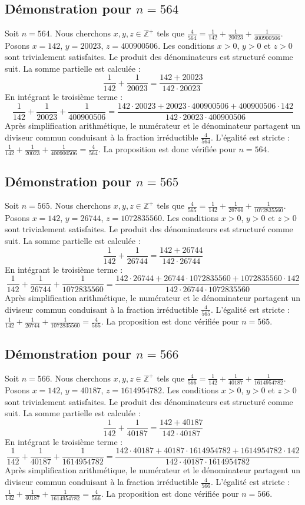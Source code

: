 \documentclass[11pt,a4paper]{article}
\begin{document}
\subsection{Démonstration pour $n = 564$}
Soit $n = 564$. Nous cherchons $x, y, z \in \mathbb{Z}^{+}$ tels que $\frac{4}{564} = \frac{1}{142} + \frac{1}{20023} + \frac{1}{400900506}$.
Posons $x = 142$, $y = 20023$, $z = 400900506$.
Les conditions $x > 0$, $y > 0$ et $z > 0$ sont trivialement satisfaites.
Le produit des dénominateurs est structuré comme suit. La somme partielle est calculée :
$$ \frac{1}{142} + \frac{1}{20023} = \frac{142+20023}{142 \cdot 20023} $$
En intégrant le troisième terme :
$$ \frac{1}{142} + \frac{1}{20023} + \frac{1}{400900506} = \frac{142 \cdot 20023 + 20023 \cdot 400900506 + 400900506 \cdot 142}{142 \cdot 20023 \cdot 400900506} $$
Après simplification arithmétique, le numérateur et le dénominateur partagent un diviseur commun conduisant à la fraction irréductible $\frac{4}{564}$.
L'égalité est stricte : $\frac{1}{142} + \frac{1}{20023} + \frac{1}{400900506} = \frac{4}{564}$.
La proposition est donc vérifiée pour $n = 564$.
\subsection{Démonstration pour $n = 565$}
Soit $n = 565$. Nous cherchons $x, y, z \in \mathbb{Z}^{+}$ tels que $\frac{4}{565} = \frac{1}{142} + \frac{1}{26744} + \frac{1}{1072835560}$.
Posons $x = 142$, $y = 26744$, $z = 1072835560$.
Les conditions $x > 0$, $y > 0$ et $z > 0$ sont trivialement satisfaites.
Le produit des dénominateurs est structuré comme suit. La somme partielle est calculée :
$$ \frac{1}{142} + \frac{1}{26744} = \frac{142+26744}{142 \cdot 26744} $$
En intégrant le troisième terme :
$$ \frac{1}{142} + \frac{1}{26744} + \frac{1}{1072835560} = \frac{142 \cdot 26744 + 26744 \cdot 1072835560 + 1072835560 \cdot 142}{142 \cdot 26744 \cdot 1072835560} $$
Après simplification arithmétique, le numérateur et le dénominateur partagent un diviseur commun conduisant à la fraction irréductible $\frac{4}{565}$.
L'égalité est stricte : $\frac{1}{142} + \frac{1}{26744} + \frac{1}{1072835560} = \frac{4}{565}$.
La proposition est donc vérifiée pour $n = 565$.
\subsection{Démonstration pour $n = 566$}
Soit $n = 566$. Nous cherchons $x, y, z \in \mathbb{Z}^{+}$ tels que $\frac{4}{566} = \frac{1}{142} + \frac{1}{40187} + \frac{1}{1614954782}$.
Posons $x = 142$, $y = 40187$, $z = 1614954782$.
Les conditions $x > 0$, $y > 0$ et $z > 0$ sont trivialement satisfaites.
Le produit des dénominateurs est structuré comme suit. La somme partielle est calculée :
$$ \frac{1}{142} + \frac{1}{40187} = \frac{142+40187}{142 \cdot 40187} $$
En intégrant le troisième terme :
$$ \frac{1}{142} + \frac{1}{40187} + \frac{1}{1614954782} = \frac{142 \cdot 40187 + 40187 \cdot 1614954782 + 1614954782 \cdot 142}{142 \cdot 40187 \cdot 1614954782} $$
Après simplification arithmétique, le numérateur et le dénominateur partagent un diviseur commun conduisant à la fraction irréductible $\frac{4}{566}$.
L'égalité est stricte : $\frac{1}{142} + \frac{1}{40187} + \frac{1}{1614954782} = \frac{4}{566}$.
La proposition est donc vérifiée pour $n = 566$.
\end{document}
